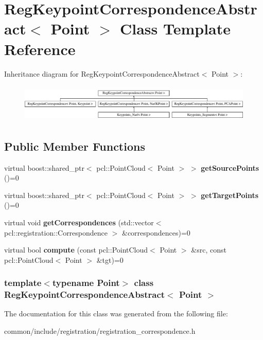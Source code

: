 \hypertarget{classRegKeypointCorrespondenceAbstract}{
\section{RegKeypointCorrespondenceAbstract$<$ Point $>$ Class Template Reference}
\label{classRegKeypointCorrespondenceAbstract}
}
Inheritance diagram for RegKeypointCorrespondenceAbstract$<$ Point $>$:\begin{figure}[H]
\begin{center}
\leavevmode
\includegraphics[height=1.818182cm]{classRegKeypointCorrespondenceAbstract}
\end{center}
\end{figure}
\subsection*{Public Member Functions}
\begin{DoxyCompactItemize}
\item 
\hypertarget{classRegKeypointCorrespondenceAbstract_aac75f2f64f77d397eb320943e4b41354}{
virtual boost::shared\_\-ptr$<$ pcl::PointCloud$<$ Point $>$ $>$ {\bfseries getSourcePoints} ()=0}
\label{classRegKeypointCorrespondenceAbstract_aac75f2f64f77d397eb320943e4b41354}

\item 
\hypertarget{classRegKeypointCorrespondenceAbstract_a114d13ab87a3a4c3e01d53002c972946}{
virtual boost::shared\_\-ptr$<$ pcl::PointCloud$<$ Point $>$ $>$ {\bfseries getTargetPoints} ()=0}
\label{classRegKeypointCorrespondenceAbstract_a114d13ab87a3a4c3e01d53002c972946}

\item 
\hypertarget{classRegKeypointCorrespondenceAbstract_a48225ab60edb7e9cdc8d162825495a11}{
virtual void {\bfseries getCorrespondences} (std::vector$<$ pcl::registration::Correspondence $>$ \&correspondences)=0}
\label{classRegKeypointCorrespondenceAbstract_a48225ab60edb7e9cdc8d162825495a11}

\item 
\hypertarget{classRegKeypointCorrespondenceAbstract_a6ecc6460024d84074efd762c4d41f7b1}{
virtual bool {\bfseries compute} (const pcl::PointCloud$<$ Point $>$ \&src, const pcl::PointCloud$<$ Point $>$ \&tgt)=0}
\label{classRegKeypointCorrespondenceAbstract_a6ecc6460024d84074efd762c4d41f7b1}

\end{DoxyCompactItemize}
\subsubsection*{template$<$typename Point$>$ class RegKeypointCorrespondenceAbstract$<$ Point $>$}



The documentation for this class was generated from the following file:\begin{DoxyCompactItemize}
\item 
common/include/registration/registration\_\-correspondence.h\end{DoxyCompactItemize}
